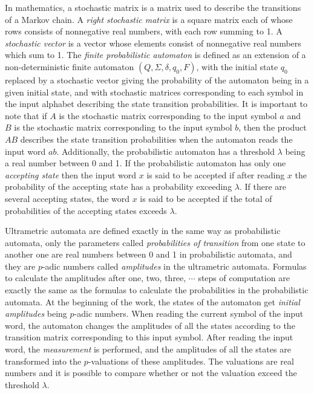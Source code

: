 \documentclass{llncs}
\begin{document}
In mathematics, a stochastic matrix  is a matrix used to describe the transitions of a Markov chain. A {\em right stochastic matrix}  is a square matrix each of whose rows consists of nonnegative real numbers, with each row summing to 1. A {\em stochastic vector} is a vector whose elements consist of nonnegative real numbers which sum to 1. The {\em finite probabilistic automaton} is defined as an extension of a non-deterministic finite automaton $(Q,\Sigma,\delta,q_0,F)$,  with the initial state $q_0$ replaced by a stochastic vector giving the probability of the automaton being in a given initial state, and with stochastic matrices corresponding to each symbol in the input alphabet describing the state transition probabilities. It is important to note that if $A$ is the stochastic matrix corresponding to the input symbol $a$ and $B$ is the stochastic matrix corresponding to the input symbol $b$, then the product $AB$ describes the state transition probabilities when the automaton reads the input word $ab$. Additionally, the probabilistic automaton has a threshold $\lambda $ being a real number between 0 and 1. If the probabilistic automaton has only one {\em accepting state} then the input word $x$ is said to be accepted if after reading $x$ the probability of the accepting state has a probability exceeding $\lambda $. If there are several accepting states, the word $x$ is said to be accepted if the total of probabilities of the accepting states exceeds $\lambda $.

Ultrametric automata are defined exactly in the same way as probabilistic automata, only the parameters called {\em probabilities of transition}  from one state to another one are real numbers between 0 and 1 in probabilistic automata, and they are $p$-adic numbers called {\em amplitudes} in the ultrametric automata. Formulas to calculate the amplitudes after one, two, three, $\cdots $ steps of computation are exactly the same as the formulas to calculate the probabilities in the probabilistic automata. At the beginning of the work, the states of the automaton get {\em initial amplitudes} being $p$-adic numbers. When reading the current symbol of the input word, the automaton changes the amplitudes of all the states according to the transition matrix corresponding to this input symbol. 
After reading the input word, the {\em measurement} is performed, and the  amplitudes of all the states are transformed into the $p$-valuations of these amplitudes. The valuations are real numbers and it is possible to compare whether or not the valuation exceed the threshold $\lambda $.
\end{document}
